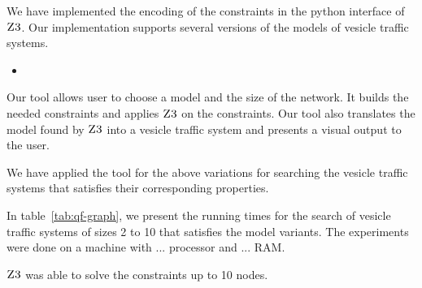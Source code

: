 We have implemented the encoding of the constraints
in the python interface of $\textsc{Z3}$.
%
Our implementation supports several versions of the
models of vesicle traffic systems.
\begin{itemize}
\item 
\end{itemize}
%
Our tool allows user to choose a model and the size of
the network.
%
It builds the needed constraints and applies $\textsc{Z3}$
on the constraints.
%
Our tool also translates the model found by $\textsc{Z3}$
into a vesicle traffic system and presents a visual
output to the user.

We have applied the tool for the above variations
for searching the vesicle traffic systems that satisfies
their corresponding properties.
%

In table~\ref{tab:qf-graph}, we present the running times
for the search of vesicle traffic systems of sizes 2 to 10
that satisfies the model variants.
%
The experiments were done on a machine with ... processor 
and ... RAM.
%

%
$\textsc{Z3}$ was able to solve the constraints up to 10
nodes.
%



